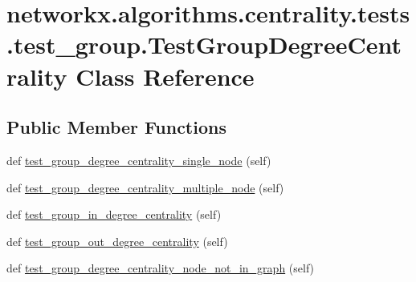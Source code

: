 \hypertarget{classnetworkx_1_1algorithms_1_1centrality_1_1tests_1_1test__group_1_1TestGroupDegreeCentrality}{}\section{networkx.\+algorithms.\+centrality.\+tests.\+test\+\_\+group.\+Test\+Group\+Degree\+Centrality Class Reference}
\label{classnetworkx_1_1algorithms_1_1centrality_1_1tests_1_1test__group_1_1TestGroupDegreeCentrality}
\subsection*{Public Member Functions}
\begin{DoxyCompactItemize}
\item 
def \hyperlink{classnetworkx_1_1algorithms_1_1centrality_1_1tests_1_1test__group_1_1TestGroupDegreeCentrality_a0fcd4d578205290f6f1c402d0207a7eb}{test\+\_\+group\+\_\+degree\+\_\+centrality\+\_\+single\+\_\+node} (self)
\item 
def \hyperlink{classnetworkx_1_1algorithms_1_1centrality_1_1tests_1_1test__group_1_1TestGroupDegreeCentrality_a2003d8594a885e609a24535cd05e434b}{test\+\_\+group\+\_\+degree\+\_\+centrality\+\_\+multiple\+\_\+node} (self)
\item 
def \hyperlink{classnetworkx_1_1algorithms_1_1centrality_1_1tests_1_1test__group_1_1TestGroupDegreeCentrality_a2057d44f28a19195ea840cb9dfae83cd}{test\+\_\+group\+\_\+in\+\_\+degree\+\_\+centrality} (self)
\item 
def \hyperlink{classnetworkx_1_1algorithms_1_1centrality_1_1tests_1_1test__group_1_1TestGroupDegreeCentrality_a68e4fe91f367d0d757b2babb4e23e340}{test\+\_\+group\+\_\+out\+\_\+degree\+\_\+centrality} (self)
\item 
def \hyperlink{classnetworkx_1_1algorithms_1_1centrality_1_1tests_1_1test__group_1_1TestGroupDegreeCentrality_aded4d0dc425a6c4f04f8fb06770b8dd2}{test\+\_\+group\+\_\+degree\+\_\+centrality\+\_\+node\+\_\+not\+\_\+in\+\_\+graph} (self)
\end{DoxyCompactItemize}


